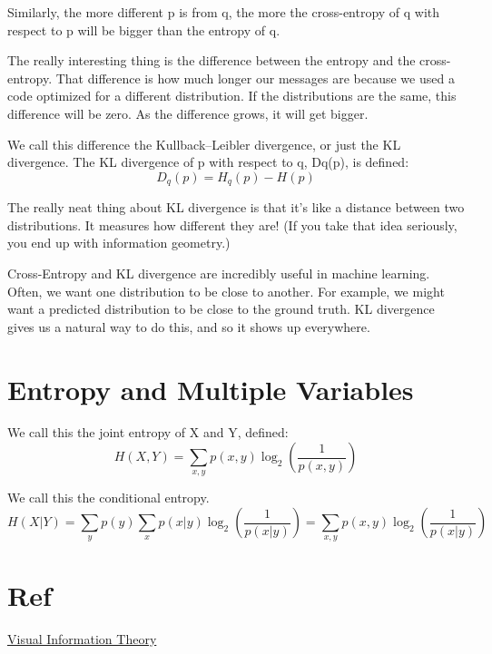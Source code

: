 Similarly, the more different p is from q, the more the cross-entropy of q with respect to p will be bigger than the entropy of q.

The really interesting thing is the difference between the entropy and the cross-entropy.
That difference is how much longer our messages are because we used a code optimized for a different distribution.
If the distributions are the same, this difference will be zero. As the difference grows, it will get bigger.

We call this difference the Kullback–Leibler divergence, or just the KL divergence. The KL divergence of p with respect to q, Dq(p), is defined:
$$D_q(p) = H_q(p) - H(p)$$

The really neat thing about KL divergence is that it's like a distance between two distributions.
It measures how different they are! (If you take that idea seriously, you end up with information geometry.)

Cross-Entropy and KL divergence are incredibly useful in machine learning. Often, we want one distribution to be close to another.
For example, we might want a predicted distribution to be close to the ground truth.
KL divergence gives us a natural way to do this, and so it shows up everywhere.

\section{Entropy and Multiple Variables}
We call this the joint entropy of X and Y, defined:
$$H(X,Y) = \sum_{x,y} p(x,y) \log_2\left(\frac{1}{p(x,y)}\right)$$

We call this the conditional entropy.
$$
H(X|Y)
= \sum_y p(y) \sum_x p(x|y) \log_2\left(\frac{1}{p(x|y)}\right)
= \sum_{x,y} p(x,y) \log_2\left(\frac{1}{p(x|y)}\right)
$$


\section*{Ref}
\href{http://colah.github.io/posts/2015-09-Visual-Information/}{Visual Information Theory}

